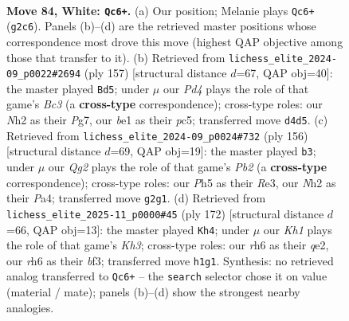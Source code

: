 \documentclass[11pt]{article}
\begin{document}
\clearpage

\begin{figure}[p]\centering
\begin{subfigure}{0.46\textwidth}\centering
\resizebox{\linewidth}{!}{%
\newchessgame
\chessboard[
  setfen={5r2/p5p1/4k2r/q6P/3P4/4P3/6QN/4b2K w - - 2 84},
  showmover=false,
  pgfstyle=straightmove, color=movearrow, markmove={g2-c6}
]}
\caption{}
\end{subfigure}\hfill
\begin{subfigure}{0.46\textwidth}\centering
\resizebox{\linewidth}{!}{%
\newchessgame
\chessboard[
  setfen={6k1/6p1/2b1p3/q1P1P1p1/1pR3P1/8/3Q1K2/8 b - - 1 79},
  showmover=false,
  pgfstyle=straightmove, color=movearrow, markmove={c6-d5}
]}
\caption{}
\end{subfigure}
\\[4pt]
\begin{subfigure}{0.46\textwidth}\centering
\resizebox{\linewidth}{!}{%
\newchessgame
\chessboard[
  setfen={8/8/r5k1/2p3q1/P1P4p/K3R3/1P1Q4/8 w - - 18 79},
  showmover=false,
  pgfstyle=straightmove, color=movearrow, markmove={b2-b3}
]}
\caption{}
\end{subfigure}\hfill
\begin{subfigure}{0.46\textwidth}\centering
\resizebox{\linewidth}{!}{%
\newchessgame
\chessboard[
  setfen={4N1k1/1p1P4/6p1/8/4PQ2/5bPK/4q3/8 w - - 5 87},
  showmover=false,
  pgfstyle=straightmove, color=movearrow, markmove={h3-h4}
]}
\caption{}
\end{subfigure}
\caption{\textbf{Move 84, White: \texttt{Qc6+}.} (a) Our position; Melanie plays \texttt{Qc6+} (\texttt{g2c6}). Panels (b)--(d) are the retrieved master positions whose correspondence most drove this move (highest QAP objective among those that transfer to it). (b) Retrieved from \texttt{lichess\_elite\_2024-09\_p0022\#2694} (ply 157) [structural distance $d$=67, QAP obj=40]: the master played \texttt{Bd5}; under $\mu$ our \emph{Pd4} plays the role of that game's \emph{Bc3} (a \textbf{cross-type} correspondence); cross-type roles: our \emph{N}h2 as their \emph{P}g7, our \emph{b}e1 as their \emph{p}c5; transferred move \texttt{d4d5}. (c) Retrieved from \texttt{lichess\_elite\_2024-09\_p0024\#732} (ply 156) [structural distance $d$=69, QAP obj=19]: the master played \texttt{b3}; under $\mu$ our \emph{Qg2} plays the role of that game's \emph{Pb2} (a \textbf{cross-type} correspondence); cross-type roles: our \emph{P}h5 as their \emph{R}e3, our \emph{N}h2 as their \emph{P}a4; transferred move \texttt{g2g1}. (d) Retrieved from \texttt{lichess\_elite\_2025-11\_p0000\#45} (ply 172) [structural distance $d$=66, QAP obj=13]: the master played \texttt{Kh4}; under $\mu$ our \emph{Kh1} plays the role of that game's \emph{Kh3}; cross-type roles: our \emph{r}h6 as their \emph{q}e2, our \emph{r}h6 as their \emph{b}f3; transferred move \texttt{h1g1}. Synthesis: no retrieved analog transferred to \texttt{Qc6+} -- the \texttt{search} selector chose it on value (material / mate); panels (b)--(d) show the strongest nearby analogies.}
\label{fig:thought-m166}
\end{figure}
\end{document}
